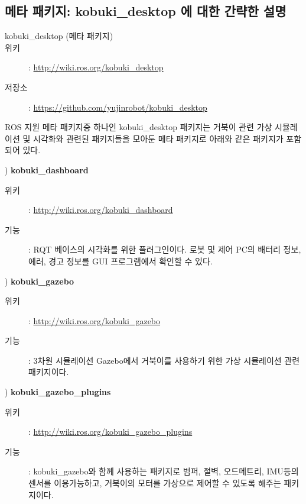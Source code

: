 \subsection{메타 패키지: kobuki\_desktop 에 대한 간략한 설명}

\vspace{\baselineskip}
\begin{description}
\item[kobuki\_desktop (메타 패키지)]
\item[위키]: \url{http://wiki.ros.org/kobuki_desktop}
\item[저장소]: \url{https://github.com/yujinrobot/kobuki_desktop}
\end{description}

\vspace{\baselineskip}
\noindent
ROS 지원 메타 패키지중 하나인 kobuki\_desktop 패키지는 거북이 관련 가상 시뮬레이션 및 시각화와 관련된 패키지들을 모아둔 메타 패키지로 아래와 같은 패키지가 포함되어 있다.

\setcounter{num}{0}

\vspace{\baselineskip}
\noindent{}
\thenum) \textbf{kobuki\_dashboard}
\begin{description}
\item[위키]: \url{http://wiki.ros.org/kobuki_dashboard}
\item[기능]: RQT 베이스의 시각화를 위한 플러그인이다. 로봇 및 제어 PC의 배터리 정보, 에러, 경고 정보를 GUI 프로그램에서 확인할 수 있다.
\end{description}

\vspace{\baselineskip}
\noindent{}
\thenum) \textbf{kobuki\_gazebo}
\begin{description}
\item[위키]: \url{http://wiki.ros.org/kobuki_gazebo}
\item[기능]: 3차원 시뮬레이션 Gazebo에서 거북이를 사용하기 위한 가상 시뮬레이션 관련 패키지이다.
\end{description}

\vspace{\baselineskip}
\noindent{}
\thenum) \textbf{kobuki\_gazebo\_plugins}
\begin{description}
\item[위키]: \url{http://wiki.ros.org/kobuki_gazebo_plugins}
\item[기능]: kobuki\_gazebo와 함께 사용하는 패키지로 범퍼, 절벽, 오드메트리, IMU등의 센서를 이용가능하고, 거북이의 모터를 가상으로 제어할 수 있도록 해주는 패키지이다.
\end{description}

